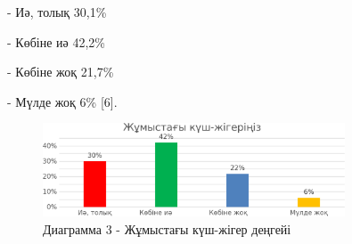 - Иә, толық 30,1\%

- Көбіне иә 42,2\%

- Көбіне жоқ 21,7\%

- Мүлде жоқ 6\% {[}6{]}.

\begin{figure}[H]
	\centering
	\includegraphics[width=0.8\textwidth]{media/ekon2/image15}
	\caption*{Диаграмма 3 - Жұмыстағы күш-жігер деңгейі}
\end{figure}

